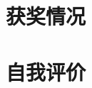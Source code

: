 \documentclass[10pt,a4paper,sans]{./moderncv/moderncv}   %
\renewcommand*{\cventry}[7][.25em]{%
  \cvitem[#1]{#2}{%
    {#3}%
    \ifthenelse{\equal{#4}{}}{}{, {#4}}%
    \ifthenelse{\equal{#5}{}}{}{, #5}%
    \ifthenelse{\equal{#6}{}}{}{, #6}%
    .\strut%
    \ifx&#7&%
      \else{\newline{}\begin{minipage}[t]{\linewidth}\small#7\end{minipage}}\fi}}
\begin{document}
\begin{CJK}{UTF8}{gbsn}
\section{获奖情况}


\section{自我评价}






\end{CJK}
\end{document}

